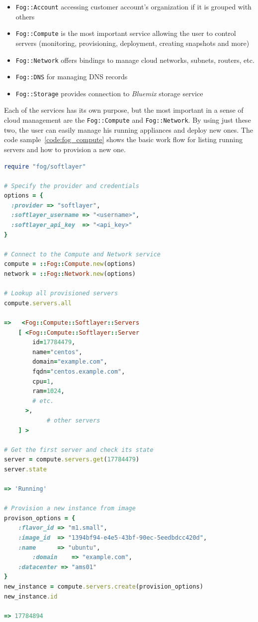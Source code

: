 \begin{itemize}
	\item \verb|Fog::Account| accessing customer account's organization if it is grouped with others
	\item \verb|Fog::Compute| is the most important service allowing the user to control servers (monitoring, provisioning, deployment, creating snapshots and more)
	\item \verb|Fog::Network| offers bindings to manage cloud networks, subnets, routers, etc.
	\item \verb|Fog::DNS| for managing DNS records
	\item \verb|Fog::Storage| provides connection to \emph{Bluemix} storage service
\end{itemize}

Each of the services has its own purpose, but the most important in a sense of cloud management are the \verb|Fog::Compute| and \verb|Fog::Network|. By using just these two, the user can easily manage his running appliances and deploy new ones. The code sample~\ref{code:fog_compute} shows the basic work flow for listing running servers and how to provision a new one.

\begin{lstlisting}[language=Ruby,caption={Example work flow for Fog SoftLayer},label=code:fog_compute,float=htpb]
require "fog/softlayer"

# Specify the provider and credentials
options = {
  :provider => "softlayer",
  :softlayer_username => "<username>",
  :softlayer_api_key  => "<api_key>"
}

# Connect to the Compute and Network service
compute = ::Fog::Compute.new(options)
network = ::Fog::Network.new(options)

# Lookup all provisioned servers
compute.servers.all

=>   <Fog::Compute::Softlayer::Servers
    [ <Fog::Compute::Softlayer::Server
        id=17784479,
        name="centos",
        domain="example.com",
        fqdn="centos.example.com",
        cpu=1,
        ram=1024,
        # etc.
      >,
			# other servers
    ] >

# Get the first server and check its state
server = compute.servers.get(17784479)
server.state

=> 'Running'

# Provision a new instance from image
provison_options = {
    :flavor_id => "m1.small",
    :image_id  => "1394bf94-e4e5-43bf-90ec-5eedbdcc420d",
    :name      => "ubuntu",
		:domain    => "example.com",
    :datacenter => "ams01"
}
new_instance = compute.servers.create(provision_options)
new_instance.id

=> 17784894
\end{lstlisting}

